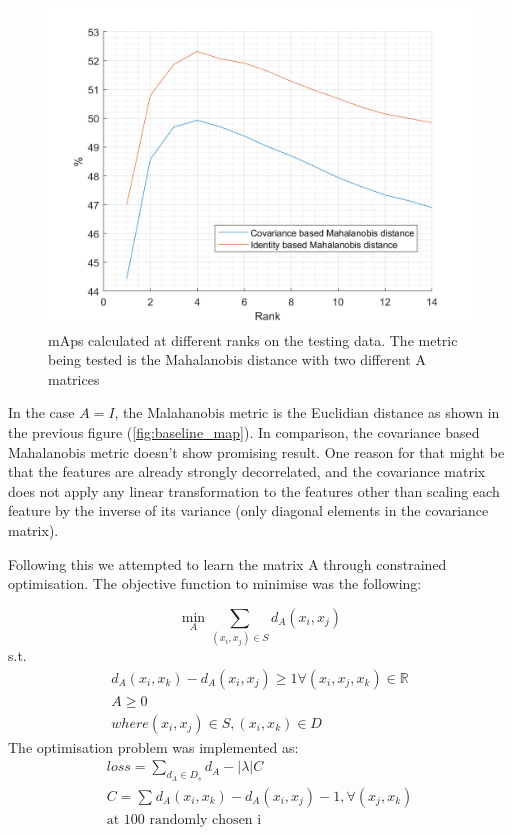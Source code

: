 \documentclass[10pt,technote]{IEEEtran}
\begin{document}
\begin{figure}
    \centering
    \includegraphics[width=\linewidth]{Graphs/maha_Map.png}
    \caption{mAps calculated at different ranks on the testing data. The metric being tested is the Mahalanobis distance with two different A matrices}
    \label{fig:maha_map}
\end{figure}

In the case $A = I$, the Malahanobis metric is the Euclidian distance as shown in the previous figure (\ref{fig:baseline_map}). In comparison, the covariance based Mahalanobis metric doesn't show promising result. One reason for that might be that the features are already strongly decorrelated, and the covariance matrix does not apply any linear transformation to the features other than scaling each feature by the inverse of its variance (only diagonal elements in the covariance matrix). 

Following this we attempted to learn the matrix A through constrained optimisation. The objective function to minimise was the following:

\begin{equation}
    \min_{A}\sum_{(x_i, x_j) \in S}{d_A (x_i, x_j)}
\end{equation}
s.t.
\begin{equation}
    \begin{aligned}
        d_A{(x_i, x_k)} - d_A (x_i, x_j) \ge 1 \forall(x_i, x_j, x_k) \in{\mathbb{R}}  \\
        A \ge 0 \\
        where (x_i, x_j) \in S, (x_i, x_k) \in D
    \end{aligned}
\end{equation}
The optimisation problem was implemented as: 
\begin{equation}
    \begin{aligned}
    loss = \sum_{d_A \in D_s}d_A - |\lambda|C \\
        C = \sum_{}d_A{(x_i, x_k)} - d_A (x_i, x_j) -1,  \forall(x_j, x_k)  \\ \text{at 100 randomly chosen i}
    \end{aligned}
\end{equation}
\end{document}
